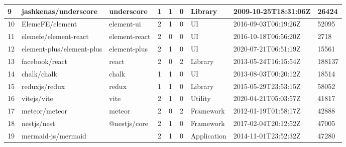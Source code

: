 \begin{landscape}
\begin{table}[h]
{\begin{tabular}{lllccclll}
                9  & jashkenas/underscore      & underscore            & 1                      & 1                 & 0                 & Library           & 2009-10-25T18:31:06Z & 26424          \\ \hline
                10 & ElemeFE/element           & element-ui            & 2                      & 1                 & 0                 & UI                & 2016-09-03T06:19:26Z & 52095          \\ \hline
                11 & elemefe/element-react     & element-react         & 2                      & 0                 & 0                 & UI                & 2016-10-18T06:56:20Z & 2718           \\ \hline
                12 & element-plus/element-plus & element-plus          & 2                      & 1                 & 0                 & UI                & 2020-07-21T06:51:19Z & 15561          \\ \hline
                13 & facebook/react            & react                 & 2                      & 0                 & 2                 & Library           & 2013-05-24T16:15:54Z & 188137         \\ \hline
                14 & chalk/chalk               & chalk                 & 1                      & 1                 & 0                 & UI                & 2013-08-03T00:20:12Z & 18514          \\ \hline
                15 & reduxjs/redux             & redux                 & 1                      & 1                 & 0                 & Library           & 2015-05-29T23:53:15Z & 58052          \\ \hline
                16 & vitejs/vite               & vite                  & 2                      & 1                 & 0                 & Utility           & 2020-04-21T05:03:57Z & 41817          \\ \hline
                17 & meteor/meteor             & meteor                & 2                      & 0                 & 2                 & Framework         & 2012-01-19T01:58:17Z & 42888          \\ \hline
                18 & nestjs/nest               & @nestjs/core          & 2                      & 1                 & 0                 & Framework         & 2017-02-04T20:12:52Z & 47005          \\ \hline
                19 & mermaid-js/mermaid        &                       & 2                      & 1                 & 0                 & Application       & 2014-11-01T23:52:32Z & 47280          \\ \hline

\end{tabular}}
\end{table}
\end{landscape}
